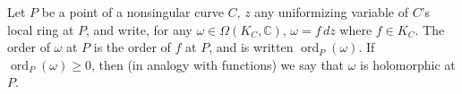 Let $P$ be a point of a nonsingular curve $C$, $z$ any uniformizing variable of $C$'s local ring at $P$, and write, for any $\omega \in \Omega(K_C, \mathbb{C})$, $\omega = f\,dz$ where $f \in K_C$. The order of $\omega$ at $P$ is the order of $f$ at $P$, and is written $\operatorname{ord}_P(\omega)$. If $\operatorname{ord}_P(\omega) \geq 0$, then (in analogy with functions) we say that $\omega$ is holomorphic at $P$.
